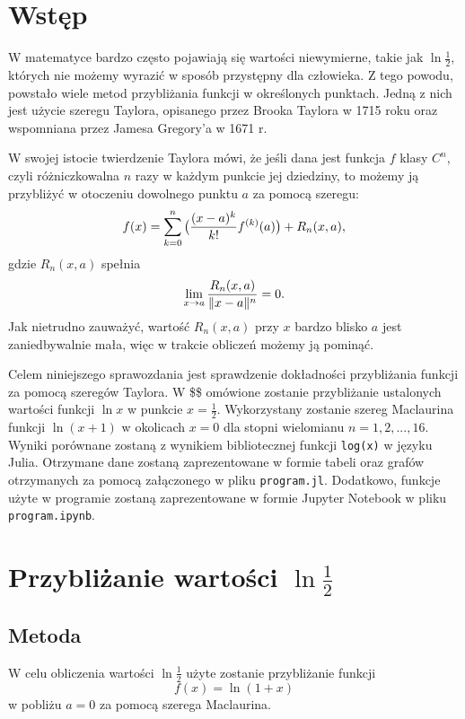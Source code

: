 \documentclass[11pt, wide, leqno]{mwart}
\begin{document}
\maketitle
\tableofcontents

\section{Wstęp}\label{sec:ws}

W matematyce bardzo często pojawiają się wartości niewymierne, takie jak $\ln \frac12$, których nie możemy wyrazić w sposób przystępny dla człowieka. Z tego powodu, powstało wiele metod przybliżania funkcji w określonych punktach. Jedną z nich jest użycie szeregu Taylora, opisanego przez Brooka Taylora w 1715 roku oraz wspomniana przez Jamesa Gregory'a w 1671 r.

W swojej istocie twierdzenie Taylora mówi, że jeśli dana jest funkcja $f$ klasy $C^n$, czyli różniczkowalna $n$ razy w każdym punkcie jej dziedziny, to możemy ją przybliżyć w otoczeniu dowolnego punktu $a$ za pomocą szeregu:
$$f(x)=\sum\limits_{k=0}^n\big({(x-a)^k\over k!} f^{(k)}(a)\big)+R_n(x, a),$$
gdzie $R_n(x, a)$ spełnia
$$\lim\limits_{x\to a}{R_n(x,a)\over\|x-a\|^n}=0.$$
Jak nietrudno zauważyć, wartość $R_n(x, a)$ przy $x$ bardzo blisko $a$ jest zaniedbywalnie mała, więc w trakcie obliczeń możemy ją pominąć.

Celem niniejszego sprawozdania jest sprawdzenie dokładności przybliżania funkcji za pomocą szeregów Taylora. W \$\$ omówione zostanie przybliżanie ustalonych wartości funkcji $\ln x$ w punkcie $x=\frac12$. Wykorzystany zostanie szereg Maclaurina funkcji $\ln(x+1)$ w okolicach $x=0$ dla stopni wielomianu $n=1, 2, ..., 16$. Wyniki porównane zostaną z wynikiem bibliotecznej funkcji \verb+log(x)+ w języku Julia. Otrzymane dane zostaną zaprezentowane w formie tabeli oraz grafów otrzymanych za pomocą załączonego w pliku \verb+program.jl+. Dodatkowo, funkcje użyte w programie zostaną zaprezentowane w formie Jupyter Notebook w pliku \verb+program.ipynb+.

\section{Przybliżanie wartości $\ln\frac12$}

\subsection{Metoda}

W celu obliczenia wartości $\ln\frac12$ użyte zostanie przybliżanie funkcji
$$f(x)=\ln (1+x)$$
w pobliżu $a=0$ za pomocą szerega Maclaurina.
\end{document}
